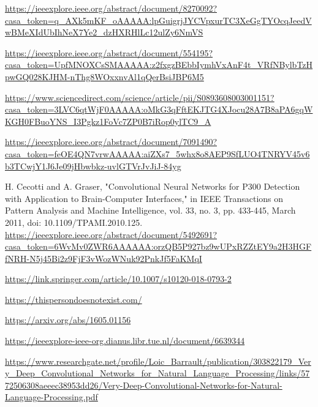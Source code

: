 \begin{thebibliography}{}
 \url{https://ieeexplore.ieee.org/abstract/document/8270092?casa_token=q_AXk5mKF_oAAAAA:lpGuigrjJYCVpxurTC3XeGgTYOcqJeedVwBMeXIdUbIhNeX7Ye2_dzHXRHlLc12ulZy6NmVS}


 \url{https://ieeexplore.ieee.org/abstract/document/554195?casa_token=UpfMNOXCsSMAAAAA:z2fxgzBEbbIymhVxAnF4t_VRfNBylbTzHpwGQ028KJHM-nThg8WOxxnvAl1qQerBsiJBP6M5}

 \url{https://www.sciencedirect.com/science/article/pii/S0893608003001151?casa_token=3LVC6qtWjF0AAAAA:oMkG3qFftEKJTG4XJocu28A7B8aPA6gqWKGH0FBuoYNS_I3Pgkz1FoVc7ZP0B7iRop0ylTC9_A}

 \url{https://ieeexplore.ieee.org/abstract/document/7091490?casa_token=feOE4QN7vrwAAAAA:aiZXs7_5whx8o8AEP9SfLUO4TNRYV45v6b3TCwjY1J6Je09jHbwbkz-uvlGTVrJvJiJ-84yg}

 H. Cecotti and A. Graser, "Convolutional Neural Networks for P300 Detection with Application to Brain-Computer Interfaces," in IEEE Transactions on Pattern Analysis and Machine Intelligence, vol. 33, no. 3, pp. 433-445, March 2011, doi: 10.1109/TPAMI.2010.125. \url{https://ieeexplore.ieee.org/abstract/document/5492691?casa_token=6WvMv0ZWR6AAAAAA:orzQB5P927bz9wUPxRZZtEY9a2H3HGFfNRH-N5j45Bi2z9FjF3vWozWNuk92PnkJf5FaKMqI}

 \url{https://link.springer.com/article/10.1007/s10120-018-0793-2}

 \url{https://thispersondoesnotexist.com/}

 \url{https://arxiv.org/abs/1605.01156}

 \url{https://ieeexplore-ieee-org.dianus.libr.tue.nl/document/6639344}

 \url{https://www.researchgate.net/profile/Loic_Barrault/publication/303822179_Very_Deep_Convolutional_Networks_for_Natural_Language_Processing/links/5772506308aeeec38953dd26/Very-Deep-Convolutional-Networks-for-Natural-Language-Processing.pdf}



















\end{thebibliography}